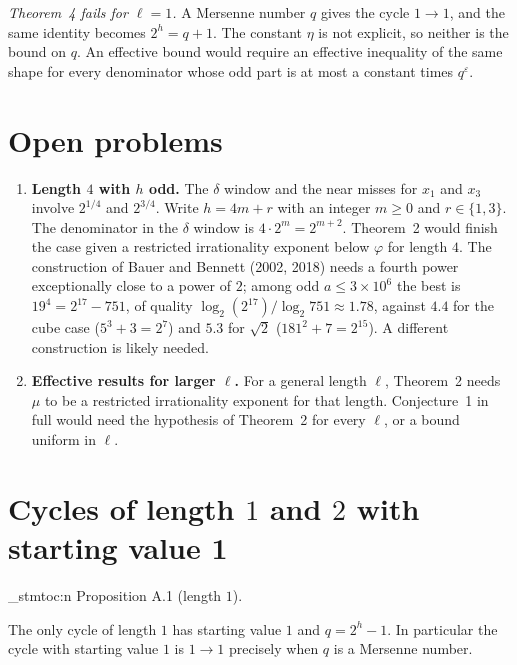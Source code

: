 \documentclass[11pt]{article}
\newenvironment{named}[1]{%
  \par\addvspace{\medskipamount}%
  \pagebreak[3]%
  \noindent{\bfseries #1}\space\ignorespaces
  \stmtoc{#1}%
}{\par\addvspace{\medskipamount}}
\newcommand{\stmtoc}[1]{ \qn_stmtoc:n {#1} }
\begin{document}
\emph{Theorem~4 fails for $\ell = 1$.}
A Mersenne number $q$ gives the cycle $1 \to 1$, and the same identity becomes $2^h = q + 1$.
The constant $\eta$ is not explicit, so neither is the bound on $q$.
An effective bound would require an effective inequality of the same shape for every denominator whose odd part is at most a constant times $q^\varepsilon$.


\section{Open problems}
\label{sec:open}

\begin{enumerate}
\item \textbf{Length $4$ with $h$ odd.}
The $\delta$ window and the near misses for $x_1$ and $x_3$ involve $2^{1/4}$ and $2^{3/4}$.
Write $h = 4m + r$ with an integer $m \ge 0$ and $r \in \{1, 3\}$. The denominator in the $\delta$ window is $4 \cdot 2^m = 2^{m+2}$.
Theorem~2 would finish the case given a restricted irrationality exponent below $\varphi$ for length $4$.
The construction of Bauer and Bennett (2002, 2018) needs a fourth power exceptionally close to a power of $2$; among odd $a \le 3 \times 10^6$ the best is $19^4 = 2^{17} - 751$, of quality $\log_2(2^{17})/\log_2 751 \approx 1.78$, against $4.4$ for the cube case ($5^3 + 3 = 2^7$) and $5.3$ for $\sqrt{2}$ ($181^2 + 7 = 2^{15}$).
A different construction is likely needed.
\item \textbf{Effective results for larger $\ell$.}
For a general length $\ell$, Theorem~2 needs $\mu$ to be a restricted irrationality exponent for that length.
Conjecture~1 in full would need the hypothesis of Theorem~2 for every $\ell$, or a bound uniform in $\ell$.
\end{enumerate}

\appendix

\section{Cycles of length $1$ and $2$ with starting value 1}
\label{app:one-two}

\label{prop:a1}
\begin{named}{Proposition A.1 (length $1$).}
The only cycle of length $1$ has starting value $1$ and $q = 2^h - 1$.
In particular the cycle with starting value $1$ is $1 \to 1$ precisely when $q$ is a Mersenne number.
\end{named}
\end{document}
